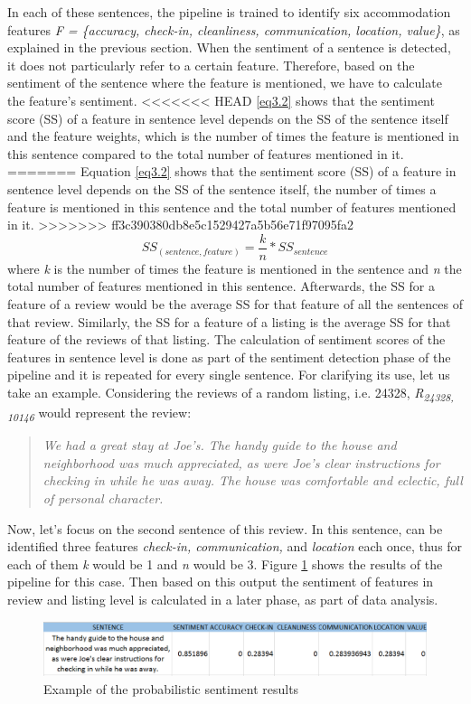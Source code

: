 In each of these sentences, the pipeline is trained to identify six accommodation features \textit{F = \{accuracy, check-in, cleanliness, communication, location, value\}}, as explained in the previous section. When the sentiment of a sentence is detected, it does not particularly refer to a certain feature. Therefore, based on the sentiment of the sentence where the feature is mentioned, we have to calculate the feature's sentiment.
<<<<<<< HEAD
\ref{eq3.2} shows that the sentiment score (SS) of a feature in sentence level depends on the SS of the sentence itself and the feature weights, which is the number of times the feature is mentioned in this sentence compared to the total number of features mentioned in it.
=======
Equation \ref{eq3.2} shows that the sentiment score (SS) of a feature in sentence level depends on the SS of the sentence itself, the number of times a feature is mentioned in this sentence and the total number of features mentioned in it.
>>>>>>> ff3c390380db8e5c1529427a5b56e71f97095fa2
%
%
\begin{equation}
SS_{(sentence,feature)} = \frac{k}{n} * SS_{sentence}
\label{eq3.2}
\end{equation}
where \textit{k} is the number of times the feature is mentioned in the sentence and \textit{n} the total number of features mentioned in this sentence. Afterwards, the SS for a feature of a review would be the average SS for that feature of all the sentences of that review. Similarly, the SS for a feature of a listing is the average SS for that feature of the reviews of that listing.
The calculation of sentiment scores of the features in sentence level is done as part of the sentiment detection phase of the pipeline and it is repeated for every single sentence. For clarifying its use, let us take an example. Considering the reviews of a random listing, i.e. 24328,  \textit{R\textsubscript{24328, 10146}} would represent the review:
\begin{quote}
\textit{We had a great stay at Joe's. The handy guide to the house and neighborhood was much appreciated, as were Joe's clear instructions for checking in while he was away. The house was comfortable and eclectic, full of personal character.}
\end{quote}
Now, let's focus on the second sentence of this review. In this sentence, can be identified three features \textit{check-in, communication,} and \textit{location} each once, thus for each of them \textit{k} would be 1 and \textit{n} would be 3. Figure \ref{fig:sent} shows the results of the pipeline for this case. Then based on this output the sentiment of features in review and listing level is calculated in a later phase, as part of data analysis.
\begin{figure}[h!]
	\centering
	\includegraphics[height=0.1\textheight]{example_pip}
	\caption{Example of the probabilistic sentiment results}
	\label{fig:sent}
\end{figure}
%

